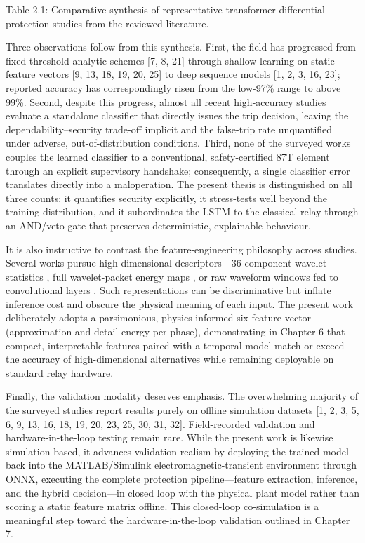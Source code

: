 Table 2.1: Comparative synthesis of representative transformer differential protection studies from the reviewed literature.

Three observations follow from this synthesis. First, the field has progressed from fixed-threshold analytic schemes [7, 8, 21] through shallow learning on static feature vectors [9, 13, 18, 19, 20, 25] to deep sequence models [1, 2, 3, 16, 23]; reported accuracy has correspondingly risen from the low-97\% range to above 99\%. Second, despite this progress, almost all recent high-accuracy studies evaluate a standalone classifier that directly issues the trip decision, leaving the dependability--security trade-off implicit and the false-trip rate unquantified under adverse, out-of-distribution conditions. Third, none of the surveyed works couples the learned classifier to a conventional, safety-certified 87T element through an explicit supervisory handshake; consequently, a single classifier error translates directly into a maloperation. The present thesis is distinguished on all three counts: it quantifies security explicitly, it stress-tests well beyond the training distribution, and it subordinates the LSTM to the classical relay through an AND/veto gate that preserves deterministic, explainable behaviour.

It is also instructive to contrast the feature-engineering philosophy across studies. Several works pursue high-dimensional descriptors---36-component wavelet statistics \cite{ref18}, full wavelet-packet energy maps \cite{ref20, ref31}, or raw waveform windows fed to convolutional layers \cite{ref16}. Such representations can be discriminative but inflate inference cost and obscure the physical meaning of each input. The present work deliberately adopts a parsimonious, physics-informed six-feature vector (approximation and detail energy per phase), demonstrating in Chapter 6 that compact, interpretable features paired with a temporal model match or exceed the accuracy of high-dimensional alternatives while remaining deployable on standard relay hardware.

Finally, the validation modality deserves emphasis. The overwhelming majority of the surveyed studies report results purely on offline simulation datasets [1, 2, 3, 5, 6, 9, 13, 16, 18, 19, 20, 23, 25, 30, 31, 32]. Field-recorded validation and hardware-in-the-loop testing remain rare. While the present work is likewise simulation-based, it advances validation realism by deploying the trained model back into the MATLAB/Simulink electromagnetic-transient environment through ONNX, executing the complete protection pipeline---feature extraction, inference, and the hybrid decision---in closed loop with the physical plant model rather than scoring a static feature matrix offline. This closed-loop co-simulation is a meaningful step toward the hardware-in-the-loop validation outlined in Chapter 7.

